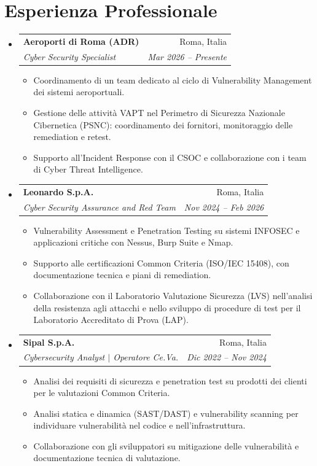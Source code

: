 \documentclass[letterpaper,11pt]{article}
\makeatletter
\newcommand{\resumeItem}[1]{\item\small{{#1\vspace{-2pt}}}}
\newcommand{\resumeSubheading}[4]{
  \vspace{-1pt}\item
  \begin{tabular*}{0.97\textwidth}[t]{l@{\extracolsep{\fill}}r}
    \textbf{#1} & #2 \\
    \textit{\small#3} & \textit{\small#4} \\
  \end{tabular*}\vspace{-3pt}
}
\newcommand{\resumeSubHeadingListStart}{\begin{itemize}[leftmargin=0.15in,label={},topsep=3pt,itemsep=4pt,parsep=0pt]}
\newcommand{\resumeSubHeadingListEnd}{\end{itemize}}
\newcommand{\resumeItemListStart}{\begin{itemize}[topsep=3pt,itemsep=2pt,parsep=0pt]}
\newcommand{\resumeItemListEnd}{\end{itemize}\vspace{-5pt}}
\makeatother
\begin{document}
\section{Esperienza Professionale}
\resumeSubHeadingListStart
  \resumeSubheading{Aeroporti di Roma (ADR)}{Roma, Italia}
    {Cyber Security Specialist}{Mar 2026 -- Presente}
    \resumeItemListStart
      \resumeItem{Coordinamento di un team dedicato al ciclo di Vulnerability Management dei sistemi aeroportuali.}
      \resumeItem{Gestione delle attività VAPT nel Perimetro di Sicurezza Nazionale Cibernetica (PSNC): coordinamento dei fornitori, monitoraggio delle remediation e retest.}
      \resumeItem{Supporto all'Incident Response con il CSOC e collaborazione con i team di Cyber Threat Intelligence.}
    \resumeItemListEnd
  \resumeSubheading{Leonardo S.p.A.}{Roma, Italia}
    {Cyber Security Assurance and Red Team}{Nov 2024 -- Feb 2026}
    \resumeItemListStart
      \resumeItem{Vulnerability Assessment e Penetration Testing su sistemi INFOSEC e applicazioni critiche con Nessus, Burp Suite e Nmap.}
      \resumeItem{Supporto alle certificazioni Common Criteria (ISO/IEC 15408), con documentazione tecnica e piani di remediation.}
      \resumeItem{Collaborazione con il Laboratorio Valutazione Sicurezza (LVS) nell'analisi della resistenza agli attacchi e nello sviluppo di procedure di test per il Laboratorio Accreditato di Prova (LAP).}
    \resumeItemListEnd
  \resumeSubheading{Sipal S.p.A.}{Roma, Italia}
    {Cybersecurity Analyst $|$ Operatore Ce.Va.}{Dic 2022 -- Nov 2024}
    \resumeItemListStart
      \resumeItem{Analisi dei requisiti di sicurezza e penetration test su prodotti dei clienti per le valutazioni Common Criteria.}
      \resumeItem{Analisi statica e dinamica (SAST/DAST) e vulnerability scanning per individuare vulnerabilità nel codice e nell'infrastruttura.}
      \resumeItem{Collaborazione con gli sviluppatori su mitigazione delle vulnerabilità e documentazione tecnica di valutazione.}
    \resumeItemListEnd
\resumeSubHeadingListEnd
\end{document}

